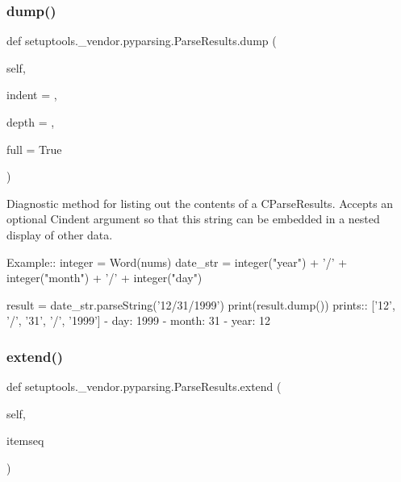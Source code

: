 \subsubsection{\texorpdfstring{dump()}{dump()}}
{\footnotesize\ttfamily def setuptools.\+\_\+vendor.\+pyparsing.\+Parse\+Results.\+dump (\begin{DoxyParamCaption}\item[{}]{self,  }\item[{}]{indent = {\ttfamily \textquotesingle{}\textquotesingle{}},  }\item[{}]{depth = {},  }\item[{}]{full = {\ttfamily True} }\end{DoxyParamCaption})}

\begin{DoxyVerb}Diagnostic method for listing out the contents of a C{ParseResults}.
Accepts an optional C{indent} argument so that this string can be embedded
in a nested display of other data.

Example::
    integer = Word(nums)
    date_str = integer("year") + '/' + integer("month") + '/' + integer("day")
    
    result = date_str.parseString('12/31/1999')
    print(result.dump())
prints::
    ['12', '/', '31', '/', '1999']
    - day: 1999
    - month: 31
    - year: 12
\end{DoxyVerb}
 \mbox{\label{classsetuptools_1_1__vendor_1_1pyparsing_1_1_parse_results_a8963c59894060ca9d0dc2c906f8d57d9}} 
\subsubsection{\texorpdfstring{extend()}{extend()}}
{\footnotesize\ttfamily def setuptools.\+\_\+vendor.\+pyparsing.\+Parse\+Results.\+extend (\begin{DoxyParamCaption}\item[{}]{self,  }\item[{}]{itemseq }\end{DoxyParamCaption})}

